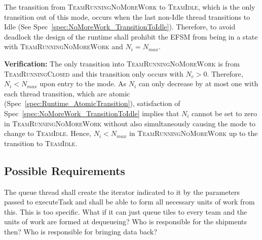 \documentclass{article}
\newcommand{\TeamIdle}          {\textsc{TeamIdle}}
\newcommand{\TeamRunningClosed} {\textsc{TeamRunningClosed}}
\newcommand{\TeamRunningNoMoreWork} {\textsc{TeamRunningNoMoreWork}}
\begin{document}
\begin{spec}
\label{spec:NoMoreWork_NeedThread}
The transition from {\TeamRunningNoMoreWork} to \TeamIdle, which is the only
transition out of this mode, occurs when the last non-Idle thread transitions to
Idle (See Spec~\ref{spec:NoMoreWork_TransitionToIdle}).  Therefore, to avoid deadlock the design of the runtime
shall prohibit the EFSM from being in a state with {\TeamRunningNoMoreWork} and
$N_i = N_{max}$.
\end{spec}
\textbf{Verification:}\hspace{0.125in}  The only transition into
{\TeamRunningNoMoreWork} is from {\TeamRunningClosed} and this transition only
occurs with $N_c > 0$.  Therefore, $N_i < N_{max}$ upon entry to
the mode.  As $N_i$ can only decrease by at most one with each thread
transition, which are atomic (Spec~\ref{spec:Runtime_AtomicTransition}),
satisfaction of Spec~\ref{spec:NoMoreWork_TransitionToIdle} implies that $N_i$
cannot be set to zero in {\TeamRunningNoMoreWork} without also simultaneously
causing the mode to change to \TeamIdle.  Hence, $N_i < N_{max}$ in
{\TeamRunningNoMoreWork} up to the transition to \TeamIdle.

\subsection{Possible Requirements}


The queue thread shall create the iterator indicated to it by the parameters
passed to executeTask and shall be able to form all necessary units of work from
this.  This is too specific.  What if it can just queue tiles to every team and
the units of work are formed at dequeueing?  Who is responsible for the
shipments then?  Who is responsible for bringing data back?
\end{document}
